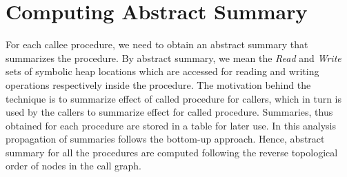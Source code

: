 \section{Computing Abstract Summary}
\label{sec:funcSummary}
For each callee procedure, we need to obtain 
an abstract summary that summarizes the procedure. 
By abstract summary, we mean the \emph{Read} 
and \emph{Write} sets of symbolic heap locations which are accessed 
for reading and writing operations respectively inside the procedure. 
The motivation behind the technique is to summarize effect of called 
procedure for callers, which in turn is used by the callers to summarize effect 
for called procedure. Summaries, thus obtained for 
each procedure are stored in a table for later use. In  
this analysis propagation of summaries 
follows the bottom-up approach. Hence, abstract summary for all the 
procedures are computed following the reverse topological order of nodes in the 
call graph. 
